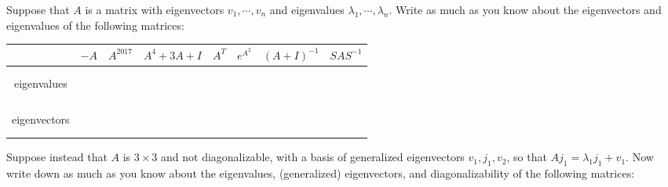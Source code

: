 \documentclass[11pt]{article}
\begin{document}
\begin{landscape}
Suppose that $A$ is a matrix with eigenvectors $v_1, \cdots, v_n$ and eigenvalues $\lambda_1, \cdots, \lambda_n$.  Write as much as you know about the eigenvectors and eigenvalues of the following matrices: \\

\begin{tabular}{ c | c | c | c | c | c | c | c  }
& \phantom{aaaa} $-A$  \phantom{aaa} & \phantom{aaaa} $A^{2017}$ \phantom{aaa} & \phantom{aaaa} $A^4 + 3A + I$ \phantom{aaa} & \phantom{aaaa} $A^T$ \phantom{aaa} & \phantom{aaaa} $e^{A^2}$\phantom{aaa} & \phantom{aaaa} $(A + I)^{-1}$ \phantom{aaa} & \phantom{aaaa} $SAS^{-1}$ \phantom{aaa} \\ \hline \hline
\makecell{\phantom{aaaaaaaa} \\\phantom{aaaaaaaa} \\ eigenvalues \\ \phantom{aaaaaaaa} \\ \phantom{aaaaaaaa}} & &&&& & \\ \hline
\makecell{\phantom{aaaaaaaa} \\\phantom{aaaaaaaa} \\ eigenvectors \\ \phantom{aaaaaaaa} \\ \phantom{aaaaaaaa}} &&&&& &
\end{tabular}

\vspace{50pt}

Suppose instead that $A$ is $3 \times 3$ and not diagonalizable, with a basis of generalized eigenvectors $v_1, j_1, v_2$, so that $Aj_1 = \lambda_1 j_1 + v_1$.  Now write down as much as you know about the eigenvalues, (generalized) eigenvectors, and diagonalizability of the following matrices: \\


\end{landscape}
\end{document}
